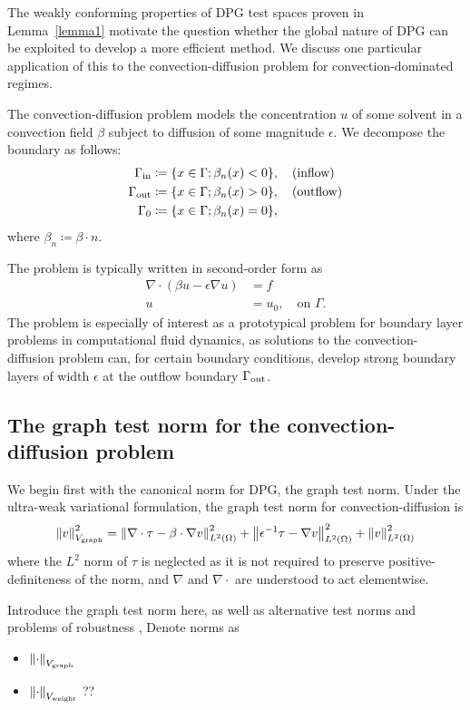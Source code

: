\documentclass[11pt,onecolumn]{scrartcl}
\newcommand{\nor}[1]{\left\| #1 \right\|}
\newcommand{\LRp}[1]{\left( #1 \right)}
\newcommand{\grad}{\nabla}
\renewcommand{\div}{\grad \cdot}
\begin{document}
The weakly conforming properties of DPG test spaces proven in Lemma~\ref{lemma1} motivate the question whether the global nature of DPG can be exploited to develop a more efficient method.  We discuss one particular application of this to the convection-diffusion problem for convection-dominated regimes.  

The convection-diffusion problem models the concentration $u$ of some solvent in a convection field $\beta$ subject to diffusion of some magnitude $\epsilon$.  We decompose the boundary as follows:
\begin{align*}
\Gamma_{\rm in} &\coloneqq \{x\in \Gamma; \beta_n(x) < 0\}, \quad {\rm
(inflow)}\\ 
\Gamma_{\rm out} &\coloneqq \{x\in \Gamma; \beta_n(x) > 0\},
\quad {\rm (outflow)}\\
\Gamma_{0} &\coloneqq \{x\in \Gamma;\beta_n(x) = 0\},
\end{align*}
where $\beta_n \coloneqq \beta \cdot n$.

The problem is typically written in second-order form as
\begin{align*}
\div\LRp{\beta u - \epsilon \grad u} &= f\\
u &= u_{0}, \quad \text{on } \Gamma.
\end{align*}
The problem is especially of interest as a prototypical problem for boundary layer problems in computational fluid dynamics, as solutions to the convection-diffusion problem can, for certain boundary conditions, develop strong boundary layers of width $\epsilon$ at the outflow boundary $\Gamma_{\rm out}$.    

\subsection{The graph test norm for the convection-diffusion problem}

We begin first with the canonical norm for DPG, the graph test norm.  Under the ultra-weak variational formulation, the graph test norm for convection-diffusion is
\[
\nor{v}_{V_{\rm graph}}^2 = \nor{\div\tau - \beta \cdot \grad v}_{L^2(\Omega)}^2 + \nor{{\epsilon}^{-1} \tau -  \grad v}_{L^2(\Omega)}^2 + \nor{v}_{L^2(\Omega)}^2
\]
where the $L^2$ norm of $\tau$ is neglected as it is not required to preserve positive-definiteness of the norm, and $\grad$ and $\div$ are understood to act elementwise.

Introduce the graph test norm here, as well as alternative test norms and problems of robustness \cite{DPGrobustness}, Denote norms as 
\begin{itemize}
\item $\nor{\cdot}_{V_{\rm graph}}$
\item $\nor{\cdot}_{V_{\rm weight}}$ ??
\end{itemize}
\end{document}
